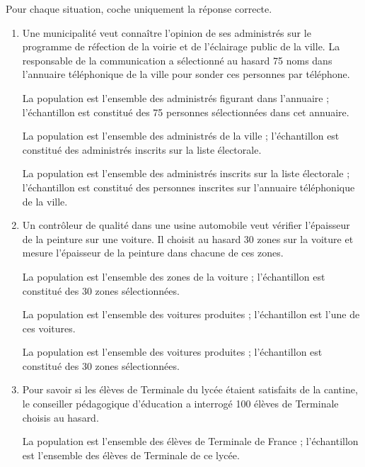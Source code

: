 %
%
    Pour chaque situation, coche uniquement la réponse correcte.
    \begin{enumerate}
        \item Une municipalité veut connaître l'opinion de ses administrés sur le programme de réfection de la voirie et de l'éclairage public de la ville. La responsable de la communication a sélectionné au hasard 75 noms dans l'annuaire téléphonique de la ville pour sonder ces personnes par téléphone.
              \begin{QCM}
                  \choice La population est l'ensemble des administrés figurant dans l'annuaire ; l'échantillon est constitué des 75 personnes sélectionnées dans cet annuaire.

                  \choice La population est l'ensemble des administrés de la ville ; l'échantillon est constitué des administrés inscrits sur la liste électorale.

                  \choice La population est l'ensemble des administrés inscrits sur la liste électorale ; l'échantillon est constitué des personnes inscrites sur l'annuaire téléphonique de la ville.
              \end{QCM}
        \item Un contrôleur de qualité dans une usine automobile veut vérifier l'épaisseur de la peinture sur une voiture. Il choisit au hasard 30 zones sur la voiture et mesure l'épaisseur de la peinture dans chacune de ces zones.
              \begin{QCM}
                  \choice La population est l'ensemble des zones de la voiture ; l'échantillon est constitué des 30 zones sélectionnées.

                  \choice La population est l'ensemble des voitures produites ; l'échantillon est l'une de ces voitures.

                  \choice La population est l'ensemble des voitures produites ; l'échantillon est constitué des 30 zones sélectionnées.
              \end{QCM}
        \item Pour savoir si les élèves de Terminale du lycée étaient satisfaits de la cantine, le conseiller pédagogique d'éducation a interrogé 100 élèves de Terminale choisis au hasard.
              \begin{QCM}
                  \choice La population est l'ensemble des élèves de Terminale de France ; l'échantillon est l'ensemble des élèves de Terminale de ce lycée.


\end{QCM}
\end{enumerate}
